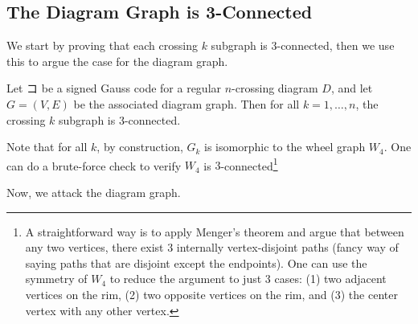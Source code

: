 \subsection{The Diagram Graph is 3-Connected}
We start by proving that each crossing $k$ subgraph is $3$-connected,
then we use this to argue the case for the diagram graph.
\begin{lemma}\label{lem:crossing-k-subgraph-3-connected}
  Let $コ$ be a signed Gauss code for a regular $n$-crossing diagram
  $D$, and let $G = (V,E)$ be the associated diagram graph. Then for
  all $k = 1, \ldots, n$, the crossing $k$ subgraph is $3$-connected.
\end{lemma}
\begin{sproof}
  Note that for all $k$, by construction, $G_k$ is isomorphic to the
  wheel graph $W_4$. One can do a brute-force check to verify $W_4$ is
  $3$-connected\footnote{A straightforward way is to apply Menger's
    theorem and argue that between any two vertices, there exist $3$
    internally vertex-disjoint paths (fancy way of saying paths that
    are disjoint except the endpoints). One can use the symmetry of
    $W_4$ to reduce the argument to just $3$ cases: (1) two adjacent
    vertices on the rim, (2) two opposite vertices on the rim, and (3)
    the center vertex with any other vertex.}
\end{sproof}
Now, we attack the diagram graph.%
